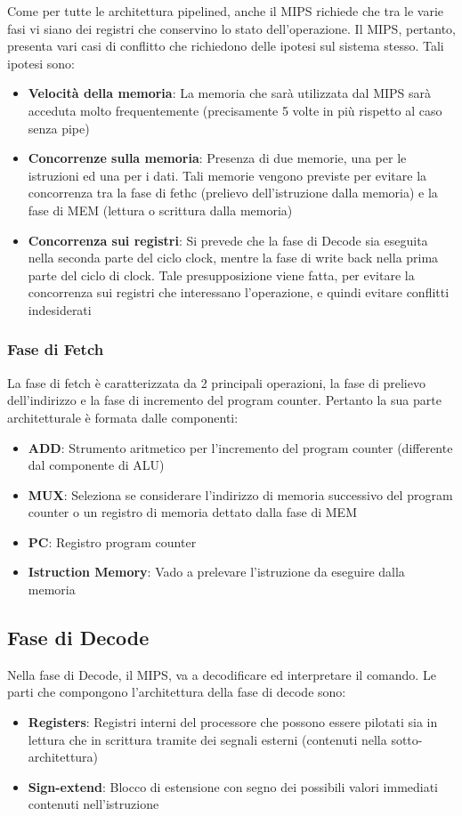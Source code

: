 Come per tutte le architettura pipelined, anche il MIPS richiede che tra le varie fasi vi siano dei registri che conservino lo stato dell'operazione.
Il MIPS, pertanto, presenta vari casi di conflitto che richiedono delle ipotesi sul sistema stesso. Tali ipotesi sono:
\begin{itemize}
    \item \textbf{Velocità della memoria}: La memoria che sarà utilizzata dal MIPS sarà acceduta molto frequentemente (precisamente 5 volte in più rispetto al caso senza pipe)
    \item \textbf{Concorrenze sulla memoria}: Presenza di due memorie, una per le istruzioni ed una per i dati. Tali memorie vengono previste per evitare la concorrenza tra la fase di fethc (prelievo dell'istruzione dalla memoria) e la fase di MEM (lettura o scrittura dalla memoria)
    \item \textbf{Concorrenza sui registri}: Si prevede che la fase di Decode sia eseguita nella seconda parte del ciclo clock, mentre la fase di write back nella prima parte del ciclo di clock. Tale presupposizione viene fatta, per evitare la concorrenza sui registri che interessano l'operazione, e quindi evitare conflitti indesiderati
\end{itemize}

\subsubsection{Fase di Fetch}
La fase di fetch è caratterizzata da 2 principali operazioni, la fase di prelievo dell'indirizzo e la fase di incremento del program counter. Pertanto la sua parte architetturale è formata dalle componenti:
\begin{itemize}
    \item \textbf{ADD}: Strumento aritmetico per l'incremento del program counter (differente dal componente di ALU)
    \item \textbf{MUX}: Seleziona se considerare l'indirizzo di memoria successivo del program counter o un registro di memoria dettato dalla fase di MEM
    \item \textbf{PC}: Registro program counter
    \item \textbf{Istruction Memory}: Vado a prelevare l'istruzione da eseguire dalla memoria
\end{itemize}

\subsection{Fase di Decode}
Nella fase di Decode, il MIPS, va a decodificare ed interpretare il comando. Le parti che compongono l'architettura della fase di decode sono:
\begin{itemize}
    \item \textbf{Registers}: Registri interni del processore che possono essere pilotati sia in lettura che in scrittura tramite dei segnali esterni (contenuti nella sotto-architettura)
    \item \textbf{Sign-extend}: Blocco di estensione con segno dei possibili valori immediati contenuti nell'istruzione
\end{itemize}

